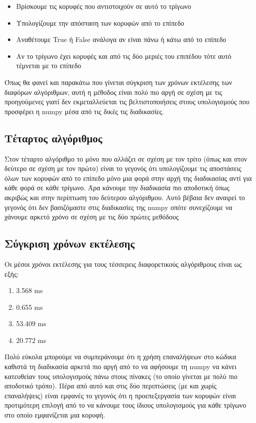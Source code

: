 \documentclass{article}
\begin{document}
\begin{itemize}
	\item Βρίσκουμε τις κορυφές που αντιστοιχούν σε αυτό το τρίγωνο
	\item Υπολογίζουμε την απόσταση των κορυφών από το επίπεδο
	\item Αναθέτουμε True ή False ανάλογα αν είναι πάνω ή κάτω από το επίπεδο
	\item Αν το τρίγωνο έχει κορυφές και από τις δύο μεριές του επιπέδου τότε αυτό τέμνεται με το επίπεδο
\end{itemize}

Όπως θα φανεί και παρακάτω που γίνεται σύγκριση των χρόνων εκτέλεσης των διαφόρων
αλγόριθμων, αυτή η μέθοδος είναι πολύ πιο αργή σε σχέση με τις προηγούμενες γιατί δεν
εκμεταλλεύεται τις βελτιστοποιήσεις στους υπολογισμούς που προσφέρει η numpy μέσα από τις
δικές τις διαδικασίες.

\subsection{Τέταρτος αλγόριθμος}
Στον τέταρτο αλγόριθμο το μόνο που αλλάζει σε σχέση με τον τρίτο (όπως και στον δεύτερο
σε σχέση με τον πρώτο) είναι το γεγονός ότι υπολογίζουμε τις αποστάσεις όλων των κορυφών
από το επίπεδο μόνο μια φορά στην αρχή της διαδικασίας αντί για κάθε φορά σε κάθε
τρίγωνο. Άρα κάνουμε την διαδικασία πιο αποδοτική όπως ακριβώς και στην περίπτωση του
δεύτερου αλγόριθμου. Αυτό βέβαια δεν αναιρεί το γεγονός ότι δεν βασιζόμαστε στις
διαδικασίες της numpy οπότε συνεχίζουμε να χάνουμε αρκετό χρόνο σε σχέση με τις δύο
πρώτες μεθόδους


\subsection{Σύγκριση χρόνων εκτέλεσης}
Οι μέσοι χρόνοι εκτέλεσης για τους τέσσερεις διαφορετικούς αλγόριθμους είναι ως εξής:

\begin{enumerate}
	\item 3.568 ms
	\item 0.655 ms
	\item 53.409 ms
	\item 20.772 ms
\end{enumerate}

Πολύ εύκολα μπορούμε να συμπεράνουμε ότι η χρήση επαναλήψεων στο κώδικα καθιστά τη
διαδικασία αρκετά πιο αργή από το να αφήσουμε τη numpy να κάνει κατευθείαν τους
υπολογισμούς πάνω στους πίνακες (το οποίο γίνεται με πολύ πιο αποδοτικό τρόπο).
Πέρα από αυτό και στις δύο περιπτώσεις (με και χωρίς επαναλήψεις) είναι εμφανές το
γεγονός ότι η προεπεξεργασία των κορυφών είναι προτιμότερη επιλογή από το να κάνουμε τους
ίδιους υπολογισμούς για κάθε τρίγωνο στο οποίο εμφανίζεται μια κορυφή.
\end{document}
